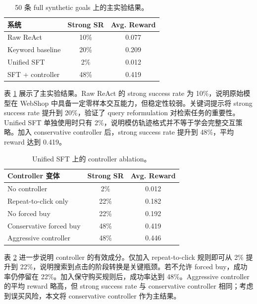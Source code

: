 \documentclass[11pt]{article}
\begin{document}
\begin{table}[t]
\centering
\small
\renewcommand{\arraystretch}{1.08}
\begin{tabularx}{\linewidth}{@{}>{\raggedright\arraybackslash}Xcc@{}}
\toprule
系统 & Strong SR & Avg. Reward \\
\midrule
Raw ReAct & 10\% & 0.077 \\
Keyword baseline & 20\% & 0.209 \\
Unified SFT & 2\% & 0.012 \\
SFT + controller & 48\% & 0.419 \\
\bottomrule
\end{tabularx}
\caption{50 条 full synthetic goals 上的主实验结果。}
\label{tab:main}
\end{table}

表 \ref{tab:main} 展示了主实验结果。Raw ReAct 的 strong success rate 为 10\%，说明原始模型在 WebShop 中具备一定零样本交互能力，但稳定性较弱。关键词提示将 strong success rate 提升到 20\%，验证了 query reformulation 对检索任务的重要性。Unified SFT 单独使用时只有 2\%，说明模仿轨迹格式并不等于学会完整交互策略。加入 conservative controller 后，strong success rate 提升到 48\%，平均 reward 达到 0.419。

\begin{table}[t]
\centering
\small
\renewcommand{\arraystretch}{1.08}
\begin{tabularx}{\linewidth}{@{}>{\raggedright\arraybackslash}Xcc@{}}
\toprule
Controller 变体 & Strong SR & Avg. Reward \\
\midrule
No controller & 2\% & 0.012 \\
Repeat-to-click only & 22\% & 0.182 \\
No forced buy & 22\% & 0.192 \\
Conservative forced buy & 48\% & 0.419 \\
Aggressive controller & 48\% & 0.446 \\
\bottomrule
\end{tabularx}
\caption{Unified SFT 上的 controller ablation。}
\label{tab:ablation}
\end{table}

表 \ref{tab:ablation} 进一步说明 controller 的有效成分。仅加入 repeat-to-click 规则即可从 2\% 提升到 22\%，说明搜索到点击的阶段转换是关键瓶颈。若不允许 forced buy，成功率仍停留在 22\%。加入保守购买规则后，成功率达到 48\%。Aggressive controller 的平均 reward 略高，但 strong success rate 与 conservative controller 相同；考虑到误买风险，本文将 conservative controller 作为主结果。
\end{document}
